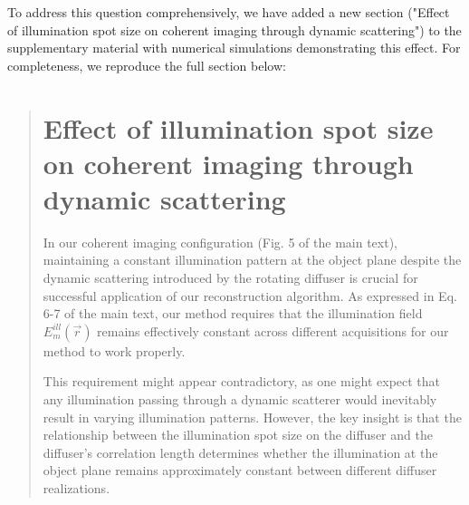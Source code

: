 \documentclass[12pt]{article}
\newenvironment{ourresponse}
    {\begin{tcolorbox}[width=\linewidth,breakable,enhanced,colback=gray!5,colframe=responsecolor!50,title=Response,left=5pt,right=5pt]}
    {\end{tcolorbox}}
\begin{document}
\begin{enumerate}[label=\arabic*.]
\begin{enumerate}[label=3.\alph*.]
\begin{ourresponse}
        To address this question comprehensively, we have added a new section ("Effect of illumination spot size on coherent imaging through dynamic scattering") to the supplementary material with numerical simulations demonstrating this effect. For completeness, we reproduce the full section below:
        \begin{quote}
            \section*{Effect of illumination spot size on coherent imaging through dynamic scattering}
        
        In our coherent imaging configuration (Fig. 5 of the main text), maintaining a constant illumination pattern at the object plane despite the dynamic scattering introduced by the rotating diffuser is crucial for successful application of our reconstruction algorithm. As expressed in Eq. 6-7 of the main text, our method requires that the illumination field $E_m^{ill}(\vec{r})$ remains effectively constant across different acquisitions for our method to work properly.
        
        This requirement might appear contradictory, as one might expect that any illumination passing through a dynamic scatterer would inevitably result in varying illumination patterns. However, the key insight is that the relationship between the illumination spot size on the diffuser and the diffuser's correlation length determines whether the illumination at the object plane remains approximately constant between different diffuser realizations.
        

\end{quote}
\end{ourresponse}
\end{enumerate}
\end{enumerate}
\end{document}
